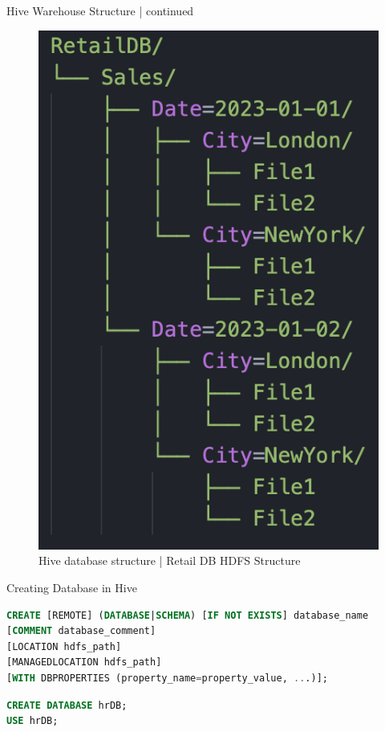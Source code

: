 \begin{frame}[fragile]{Hive Warehouse Structure | continued}


	\begin{figure}
	\includegraphics[width=\textwidth,height=.65\textheight,keepaspectratio]{./Figures/chapter-03/Screenshot_retail_db.png}
		
	\caption{Hive database structure | Retail DB HDFS Structure}	
	\end{figure}
	\end{frame}

\begin{frame}[fragile]{Creating Database in Hive}

\begin{lstlisting}[caption={Create Database command in Hive},language=SQL]
CREATE [REMOTE] (DATABASE|SCHEMA) [IF NOT EXISTS] database_name
[COMMENT database_comment]
[LOCATION hdfs_path]
[MANAGEDLOCATION hdfs_path]
[WITH DBPROPERTIES (property_name=property_value, ...)];  
\end{lstlisting}	
\begin{lstlisting}[caption={Create Database Example},language=SQL]
CREATE DATABASE hrDB;
USE hrDB;
\end{lstlisting}		

\end{frame}  


